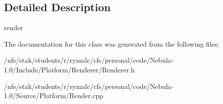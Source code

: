 \subsection{Detailed Description}
render 

The documentation for this class was generated from the following files:\begin{DoxyCompactItemize}
\item 
/nfs/stak/students/r/rymalc/cfs/personal/code/Nebula-\/1.0/Include/Platform/Renderer/Renderer.h\item 
/nfs/stak/students/r/rymalc/cfs/personal/code/Nebula-\/1.0/Source/Platform/Render.cpp\end{DoxyCompactItemize}
